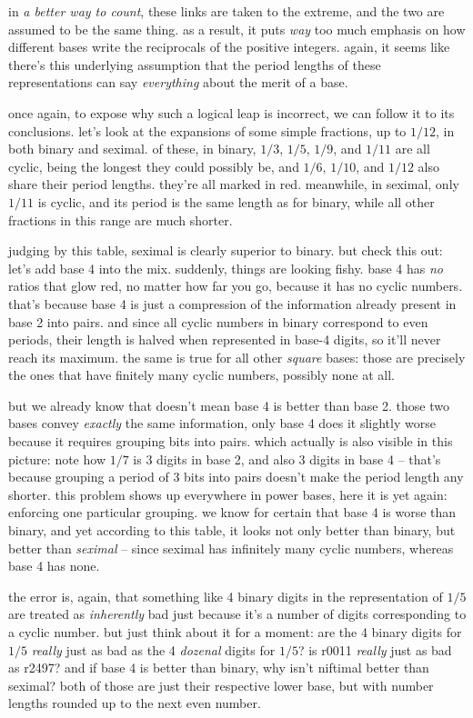 \documentclass[../best.tex]{subfiles}
\begin{document}
in {\it a better way to count}, these links are taken to the extreme, and the two are assumed to be the same thing. as a result, it puts \emph{way} too much emphasis on how different bases write the reciprocals of the positive integers. again, it seems like there's this underlying assumption that the period lengths of these representations can say \emph{everything} about the merit of a base.

once again, to expose why such a logical leap is incorrect, we can follow it to its conclusions. let's look at the expansions of some simple fractions, up to $1/12$, in both binary and seximal. of these, in binary, $1/3$, $1/5$, $1/9$, and $1/11$ are all cyclic, being the longest they could possibly be, and $1/6$, $1/10$, and $1/12$ also share their period lengths. they're all marked in red. meanwhile, in seximal, only $1/11$ is cyclic, and its period is the same length as for binary, while all other fractions in this range are much shorter.\myfootnote{}

judging by this table, seximal is clearly superior to binary. but check this out: let's add base 4 into the mix. suddenly, things are looking fishy. base 4 has \emph{no} ratios that glow red, no matter how far you go, because it has no cyclic numbers. that's because base 4 is just a compression of the information already present in base 2 into pairs. and since all cyclic numbers in binary correspond to even periods,\myfootnote{} their length is halved when represented in base-4 digits, so it'll never reach its maximum. the same is true for all other \emph{square} bases: those are precisely the ones that have finitely many cyclic numbers, possibly none at all.\myfootnote{}

but we already know that doesn't mean base 4 is better than base 2. those two bases convey \emph{exactly} the same information, only base 4 does it slightly worse because it requires grouping bits into pairs. which actually is also visible in this picture: note how $1/7$ is 3 digits in base 2, and also 3 digits in base 4 -- that's because grouping a period of 3 bits into pairs doesn't make the period length any shorter. this problem shows up everywhere in power bases, here it is yet again: enforcing one particular grouping. we know for certain that base 4 is worse than binary, and yet according to this table, it looks not only better than binary, but better than \emph{seximal} -- since seximal has infinitely many cyclic numbers, whereas base 4 has none.

the error is, again, that something like 4 binary digits in the representation of $1/5$ are treated as \emph{inherently} bad just because it's a number of digits corresponding to a cyclic number. but just think about it for a moment: are the 4 binary digits for $1/5$ \emph{really} just as bad as the 4 \emph{dozenal} digits for $1/5$? is r0011 \emph{really} just as bad as r2497? and if base 4 is better than binary, why isn't niftimal better than seximal? both of those are just their respective lower base, but with number lengths rounded up to the next even number.\myfootnote{}
\end{document}
